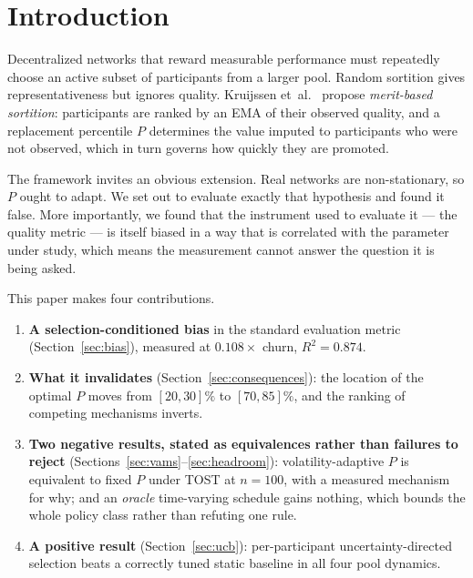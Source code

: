 \documentclass[10pt,twocolumn]{article}
\begin{document}
\section{Introduction}

Decentralized networks that reward measurable performance must repeatedly choose an
active subset of participants from a larger pool. Random sortition gives
representativeness but ignores quality. Kruijssen et~al.~\cite{kruijssen2024} propose
\emph{merit-based sortition}: participants are ranked by an EMA of their observed
quality, and a replacement percentile $P$ determines the value imputed to participants
who were not observed, which in turn governs how quickly they are promoted.

The framework invites an obvious extension. Real networks are non-stationary, so $P$
ought to adapt. We set out to evaluate exactly that hypothesis and found it false.
More importantly, we found that the instrument used to evaluate it --- the quality
metric --- is itself biased in a way that is correlated with the parameter under study,
which means the measurement cannot answer the question it is being asked.

This paper makes four contributions.

\begin{enumerate}\itemsep2pt
\item \textbf{A selection-conditioned bias} in the standard evaluation metric
(Section~\ref{sec:bias}), measured at $0.108\times$ churn, $R^2=0.874$.

\item \textbf{What it invalidates} (Section~\ref{sec:consequences}): the location of
the optimal $P$ moves from $[20,30]\%$ to $[70,85]\%$, and the ranking of competing
mechanisms inverts.

\item \textbf{Two negative results, stated as equivalences rather than failures to
reject} (Sections~\ref{sec:vams}--\ref{sec:headroom}): volatility-adaptive $P$ is
equivalent to fixed $P$ under TOST at $n=100$, with a measured mechanism for why; and
an \emph{oracle} time-varying schedule gains nothing, which bounds the whole policy
class rather than refuting one rule.

\item \textbf{A positive result} (Section~\ref{sec:ucb}): per-participant
uncertainty-directed selection beats a correctly tuned static baseline in all four
pool dynamics.
\end{enumerate}
\end{document}
